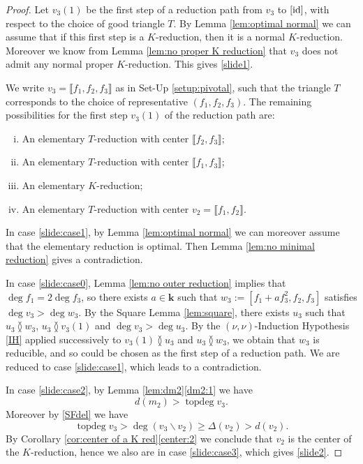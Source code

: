 \documentclass[reqno,oneside,11pt]{amsart}
\theoremstyle{plain}
\theoremstyle{definition}
\newcommand{\K}{\mathbf{k}}
\DeclareMathOperator{\topdeg}{topdeg}
\newcommand{\id}{\text{\rm id}}
\renewcommand{\ne}{\between}
\newcommand{\llb}{\llbracket}
\newcommand{\rrb}{\rrbracket}
\renewcommand{\ge}{\geqslant}
\begin{document}
\begin{proof}
Let $v_3(1)$ be the first step of a reduction path from $v_3$ to $[\id]$,
with respect to the choice of good triangle $T$.
By Lemma \ref{lem:optimal normal} we can assume that if this first step is a $K$-reduction, then it is a normal $K$-reduction.
Moreover we know from Lemma \ref{lem:no proper K reduction} that $v_3$
does not admit any normal proper $K$-reduction.
This gives \ref{slide1}.

We write $v_3 = \llb f_1, f_2, f_3 \rrb$ as in Set-Up \ref{setup:pivotal}, such
that the triangle $T$ corresponds to the choice of representative $(f_1, f_2,
f_3)$.
The remaining possibilities for the first step $v_3(1)$ of the
reduction path are:
\begin{enumerate}[(i)]
\item \label{slide:case1} An elementary $T$-reduction with center $\llb f_2,
f_3 \rrb$;
\item \label{slide:case0} An elementary $T$-reduction with center $\llb f_1,
f_3 \rrb$;
\item \label{slide:case2} An elementary $K$-reduction;
\item \label{slide:case3} An elementary $T$-reduction with center $v_2 = \llb
f_1, f_2 \rrb$.
\end{enumerate}

In case \ref{slide:case1}, by Lemma \ref{lem:optimal normal} we can moreover assume that the elementary reduction is optimal.
Then Lemma \ref{lem:no minimal reduction} gives a contradiction.

In case \ref{slide:case0}, Lemma \ref{lem:no outer reduction}
implies that $\deg f_1 = 2\deg f_3$, so there exists $a \in \K$ such that $w_3
:= [f_1 + a f_3^2, f_2, f_3]$ satisfies $\deg v_3 > \deg w_3$.
By the Square Lemma \ref{lem:square}, there exists $u_3$ such that $u_3 \ne
w_3$, $u_3 \ne v_3(1)$ and $\deg v_3 > \deg u_3$.
By the $(\nu,\nu)$-Induction Hypothesis \ref{IH} applied successively to $v_3(1) \ne
u_3$ and $u_3 \ne w_3$, we obtain that $w_3$ is reducible, and so could be
chosen as the first step of a reduction path.
We are reduced to case \ref{slide:case1}, which leads to a contradiction.

In case \ref{slide:case2}, by Lemma \ref{lem:dm2}\ref{dm2:1}  we have
$$d(m_2) > \topdeg v_3.$$
Moreover by \ref{SFdel} we have
$$\topdeg v_3 > \deg (v_3 \smallsetminus v_2) \ge \Delta(v_2) > d(v_2).$$
By Corollary \ref{cor:center of a K red}\ref{center:2} we conclude that $v_2$ is the center of the $K$-reduction, hence we also are in case \ref{slide:case3}, which gives \ref{slide2}.


\end{proof}
\end{document}
